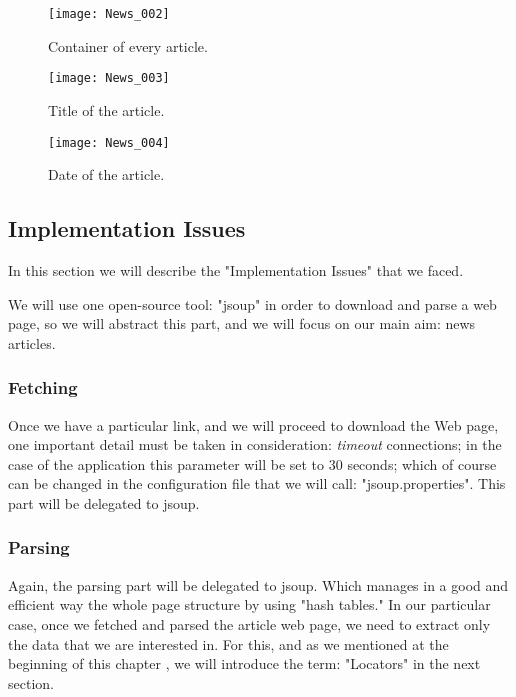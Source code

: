 	\begin{figure}\centering
		\texttt{[image: News\_002]}
		\caption{Container of every article.}\label{fig:News_002}
	\end{figure}
	
	\begin{figure}\centering
		\texttt{[image: News\_003]}
		\caption{Title of the article.}\label{fig:News_003}
	\end{figure}
	
	\begin{figure}\centering
		\texttt{[image: News\_004]}
		\caption{Date of the article.}\label{fig:News_004}
	\end{figure}

\subsection{Implementation Issues}\label{implementationIssues}
In this section we will describe the "Implementation Issues" \cite[p. 315]{L2011} that we faced.

We will use one open-source tool: "\gls{jsoup}" in order to download and parse a web page, so we will abstract this part, and we will focus on our main aim: news articles.

\subsubsection{Fetching}\label{fetching}
Once we have a particular link, and we will proceed to download the Web page, one important detail must be taken in consideration: \textit{timeout} connections; in the case of the application this parameter will be set to 30 seconds; which of course can be changed in the configuration file that we will call: "jsoup.properties". This part will be delegated to \gls{jsoup}.

\subsubsection{Parsing}\label{parsing}
Again, the parsing part will be delegated to \gls{jsoup}. Which manages in a good and efficient way the whole page structure by using "\gls{hash tables}." In our particular case, once we fetched and parsed the article web page, we need to extract only the data that we are interested in. For this, and as we mentioned at the beginning of this chapter , we will introduce the term: "Locators" in the next section.

